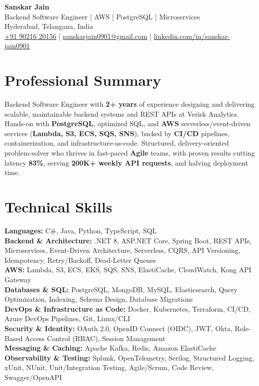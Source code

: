 \documentclass[a4paper,10pt]{article}
\begin{document}
\begin{center}
    {\LARGE \textbf{Sanskar Jain}} \\
    \vspace{2pt}
    Backend Software Engineer \;|\; AWS \;|\; PostgreSQL \;|\; Microservices \\
    \vspace{2pt}
    Hyderabad, Telangana, India \\
    \href{tel:+919021620156}{+91 90216 20156} \;|\;
    \href{mailto:sanskarjain0901@gmail.com}{sanskarjain0901@gmail.com} \;|\;
    \href{https://www.linkedin.com/in/sanskar-jain0901/}{linkedin.com/in/sanskar-jain0901}
\end{center}

\vspace{1pt}

\section*{Professional Summary}
Backend Software Engineer with \textbf{2+ years} of experience designing and delivering scalable, maintainable backend systems and REST APIs at Verisk Analytics.
Hands-on with \textbf{PostgreSQL}, optimized SQL, and \textbf{AWS} serverless/event-driven services (\textbf{Lambda, S3, ECS, SQS, SNS}), backed by \textbf{CI/CD} pipelines, containerization, and infrastructure-as-code.
Structured, delivery-oriented problem-solver who thrives in fast-paced \textbf{Agile} teams, with proven results cutting latency \textbf{83\%}, serving \textbf{200K+ weekly API requests}, and halving deployment time.

\section*{Technical Skills}
\begin{sloppypar}
\noindent
\textbf{Languages:} C\#, Java, Python, TypeScript, SQL \\
\textbf{Backend \& Architecture:} .NET 8, ASP.NET Core, Spring Boot, REST APIs, Microservices, Event-Driven Architecture, Serverless, CQRS, API Versioning, Idempotency, Retry/Backoff, Dead-Letter Queues \\
\textbf{AWS:} Lambda, S3, ECS, EKS, SQS, SNS, ElastiCache, CloudWatch, Kong API Gateway \\
\textbf{Databases \& SQL:} PostgreSQL, MongoDB, MySQL, Elasticsearch, Query Optimization, Indexing, Schema Design, Database Migrations \\
\textbf{DevOps \& Infrastructure as Code:} Docker, Kubernetes, Terraform, CI/CD, Azure DevOps Pipelines, Git, Linux/CLI \\
\textbf{Security \& Identity:} OAuth 2.0, OpenID Connect (OIDC), JWT, Okta, Role-Based Access Control (RBAC), Session Management \\
\textbf{Messaging \& Caching:} Apache Kafka, Redis, Amazon ElastiCache \\
\textbf{Observability \& Testing:} Splunk, OpenTelemetry, Serilog, Structured Logging, xUnit, NUnit, Unit/Integration Testing, Agile/Scrum, Code Review, Swagger/OpenAPI
\end{sloppypar}
\end{document}
